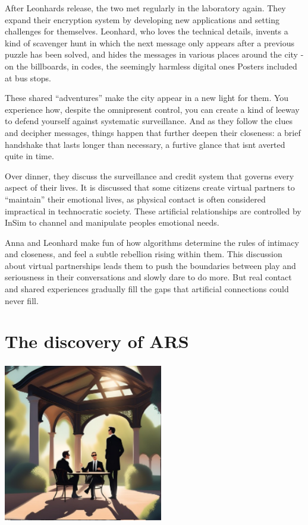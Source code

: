 \documentclass[
]{article}
\begin{document}
After Leonhard\textquotesingle s release, the two met regularly in the
laboratory again. They expand their encryption system by developing new
applications and setting challenges for themselves. Leonhard, who loves
the technical details, invents a kind of scavenger hunt in which the
next message only appears after a previous puzzle has been solved, and
hides the messages in various places around the city - on the
billboards, in codes, the seemingly harmless digital ones Posters
included at bus stops.

These shared ``adventures'' make the city appear in a new light for
them. You experience how, despite the omnipresent control, you can
create a kind of leeway to defend yourself against systematic
surveillance. And as they follow the clues and decipher messages, things
happen that further deepen their closeness: a brief handshake that lasts
longer than necessary, a furtive glance that isn\textquotesingle t
averted quite in time.

Over dinner, they discuss the surveillance and credit system that
governs every aspect of their lives. It is discussed that some citizens
create virtual partners to ``maintain'' their emotional lives, as
physical contact is often considered impractical in technocratic
society. These artificial relationships are controlled by InSim to
channel and manipulate people\textquotesingle s emotional needs.

Anna and Leonhard make fun of how algorithms determine the rules of
intimacy and closeness, and feel a subtle rebellion rising within them.
This discussion about virtual partnerships leads them to push the
boundaries between play and seriousness in their conversations and
slowly dare to do more. But real contact and shared experiences
gradually fill the gaps that artificial connections could never fill.

\section{The discovery of ARS}\label{the-discovery-of-ars}

\includegraphics[width=2.73958in,height=2.76042in]{media/image4.png}
\end{document}
